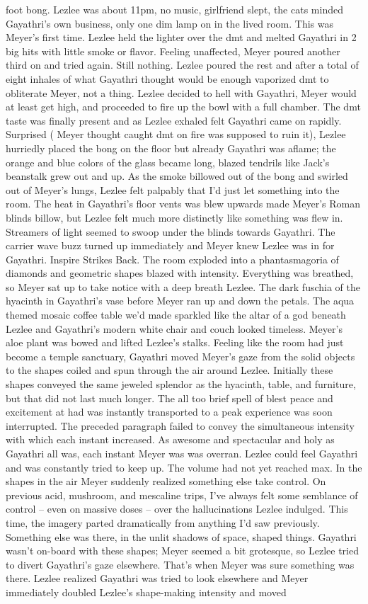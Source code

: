 \documentclass[12pt]{book}
\begin{document}
foot bong. Lezlee was about 11pm, no music, girlfriend slept, the cats minded Gayathri's own business, only one dim lamp on in the lived room. This was Meyer's first time. Lezlee held the lighter over the dmt and melted Gayathri in 2 big hits with little smoke or flavor. Feeling unaffected, Meyer poured another third on and tried again. Still nothing. Lezlee poured the rest and after a total of eight inhales of what Gayathri thought would be enough vaporized dmt to obliterate Meyer, not a thing. Lezlee decided to hell with Gayathri, Meyer would at least get high, and proceeded to fire up the bowl with a full chamber. The dmt taste was finally present and as Lezlee exhaled felt Gayathri came on rapidly. Surprised ( Meyer thought caught dmt on fire was supposed to ruin it), Lezlee hurriedly placed the bong on the floor but already Gayathri was aflame; the orange and blue colors of the glass became long, blazed tendrils like Jack's beanstalk grew out and up. As the smoke billowed out of the bong and swirled out of Meyer's lungs, Lezlee felt palpably that I'd just let something into the room. The heat in Gayathri's floor vents was blew upwards made Meyer's Roman blinds billow, but Lezlee felt much more distinctly like something was flew in. Streamers of light seemed to swoop under the blinds towards Gayathri. The carrier wave buzz turned up immediately and Meyer knew Lezlee was in for Gayathri. Inspire Strikes Back. The room exploded into a phantasmagoria of diamonds and geometric shapes blazed with intensity. Everything was breathed, so Meyer sat up to take notice with a deep breath Lezlee. The dark fuschia of the hyacinth in Gayathri's vase before Meyer ran up and down the petals. The aqua themed mosaic coffee table we'd made sparkled like the altar of a god beneath Lezlee and Gayathri's modern white chair and couch looked timeless. Meyer's aloe plant was bowed and lifted Lezlee's stalks. Feeling like the room had just become a temple sanctuary, Gayathri moved Meyer's gaze from the solid objects to the shapes coiled and spun through the air around Lezlee. Initially these shapes conveyed the same jeweled splendor as the hyacinth, table, and furniture, but that did not last much longer. The all too brief spell of blest peace and excitement at had was instantly transported to a peak experience was soon interrupted. The preceded paragraph failed to convey the simultaneous intensity with which each instant increased. As awesome and spectacular and holy as Gayathri all was, each instant Meyer was was overran. Lezlee could feel Gayathri and was constantly tried to keep up. The volume had not yet reached max. In the shapes in the air Meyer suddenly realized something else take control. On previous acid, mushroom, and mescaline trips, I've always felt some semblance of control -- even on massive doses -- over the hallucinations Lezlee indulged. This time, the imagery parted dramatically from anything I'd saw previously. Something else was there, in the unlit shadows of space, shaped things. Gayathri wasn't on-board with these shapes; Meyer seemed a bit grotesque, so Lezlee tried to divert Gayathri's gaze elsewhere. That's when Meyer was sure something was there. Lezlee realized Gayathri was tried to look elsewhere and Meyer immediately doubled Lezlee's shape-making intensity and moved 
\end{document}
